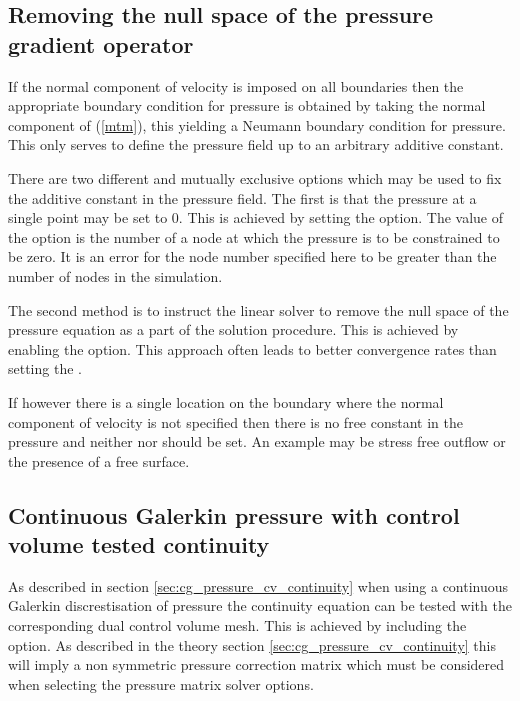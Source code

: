 \subsection{Removing the null space of the pressure gradient operator} \label{Nullspaceremove}

If the normal component of velocity is imposed on all boundaries then the
appropriate boundary condition for pressure 
\citep[see][]{gresho87} is obtained by taking the normal component of
(\ref{mtm}), this yielding a Neumann boundary condition for
pressure. This only serves to define the pressure field up to an
arbitrary additive constant.

There are two different and mutually exclusive options which may be used to
fix the additive constant in the pressure field. The first is that the
pressure at a single point may be set to 0. This is achieved by setting the
 option. The
value of the option is the number of a node at which the pressure is to be
constrained to be zero. It is an error for the node number specified here to
be greater than the number of nodes in the simulation.

The second method is to instruct the linear solver to remove the null space
of the pressure equation as a part of the solution procedure. This is
achieved by enabling the\linebreak
{}
option. This approach often leads to better convergence rates than setting
the .

If however there is a single location on the boundary where the normal
component of velocity is not specified then there is no free constant in the
pressure and neither  nor
 should be set. An example
may be stress free outflow or the presence of a free surface.

\subsection{Continuous Galerkin pressure with control volume tested continuity}
\label{sec:config_cg_pressure_cv_continuity}

As described in section \ref{sec:cg_pressure_cv_continuity} when using a continuous Galerkin 
discrestisation of pressure the continuity equation can be tested with the corresponding 
dual control volume mesh. This is achieved by including the \linebreak 
{}
option. As described in the theory section \ref{sec:cg_pressure_cv_continuity} this will imply a 
non symmetric pressure correction matrix which must be considered when selecting the pressure 
matrix solver options.

